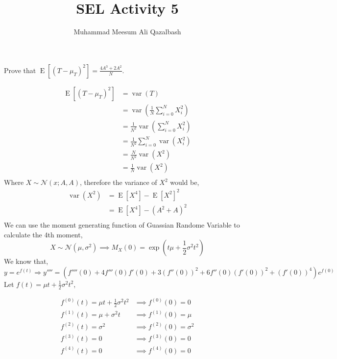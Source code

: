 \documentclass{exam}
\title{SEL Activity 5}
\author{Muhammad Meesum Ali Qazalbash}
\theoremstyle{mytheoremstyle}
\theoremstyle{mytheoremstyle}
\theoremstyle{myproblemstyle}
\begin{document}
\maketitle

\begin{questions}
	\question Prove that \(\displaystyle\operatorname{E}\left[\left(T-\mu_{T}\right)^{2}\right]=\frac{4A^{3}+2A^{2}}{N}\).

	\begin{solution}
		\begin{equation}\label{proof}
			\begin{split}
				\operatorname{E}\left[\left(T-\mu_{T}\right)^{2}\right]&=\operatorname{var}(T)\\
				&=\operatorname{var}\left(\frac{1}{N}\sum_{i=0}^{N}X^{2}_{i}\right)\\
				&=\frac{1}{N^2}\operatorname{var}\left(\sum_{i=0}^{N}X^{2}_{i}\right)\\
				&=\frac{1}{N^2}\sum_{i=0}^{N}\operatorname{var}\left(X^{2}_{i}\right)\\
				&=\frac{N}{N^2}\operatorname{var}\left(X^{2}\right)\\
				&=\frac{1}{N}\operatorname{var}\left(X^{2}\right)\\
			\end{split}
		\end{equation}
		Where \(X\sim\mathcal{N}(x;A,A)\), therefore the variance of \(X^2\) would be,
		\begin{equation*}
			\begin{split}
				\operatorname{var}\left(X^{2}\right)&=\operatorname{E}\left[X^{4}\right]-\operatorname{E}\left[X^2\right]^2\\
				&=\operatorname{E}\left[X^{4}\right]-\left(A^2+A\right)^2\\
			\end{split}
		\end{equation*}
		We can use the moment generating function of Guassian Randome Variable to calculate the 4th moment,
		\[X\sim \mathcal{N}(\mu,\sigma^{2}) \implies M_{X}(0)=\exp{\left(t\mu+\frac{1}{2}\sigma^2t^2\right)}\]
		We know that,
		\[y=e^{f(t)}\Rightarrow y''''=\left(f''''(0)+4f'''(0)f'(0)+3(f''(0))^2+6f''(0)(f'(0))^2+(f'(0))^{4}\right)e^{f(0)}\]
		Let \(f(t)=\mu t+\frac{1}{2}\sigma^{2}t^{2}\),

		\begin{align*}
			f^{(0)}(t)=\mu t+\frac{1}{2}\sigma^{2}t^{2} & \implies f^{(0)}(0)= 0          \\
			f^{(1)}(t)=\mu+\sigma^{2}t                  & \implies f^{(1)}(0)= \mu        \\
			f^{(2)}(t)=\sigma^{2}                       & \implies f^{(2)}(0)= \sigma^{2} \\
			f^{(3)}(t)=0                                & \implies f^{(3)}(0)= 0          \\
			f^{(4)}(t)=0                                & \implies f^{(4)}(0)= 0          \\
		\end{align*}


\end{solution}
\end{questions}
\end{document}
